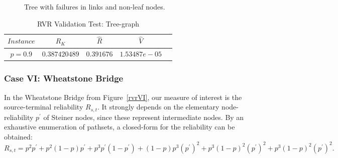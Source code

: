 \begin{figure}[H]
\begin{center}
\caption{Tree with failures in links and non-leaf nodes. \label{rvrV}}
\end{center}
\end{figure}

\begin{table}[H]
\caption{RVR Validation Test: Tree-graph} %
\centering  %
\begin{tabular}{|c|c|c|c|c|} %
\hline	$Instance$   &	$R_{K}$ & $\hat{R}$&  $\hat{V}$ \\
\hline	$p=0.9$	& $0.387420489$ &	$0.391676$ 	&	$1.53487e-05$	\\
\hline
\end{tabular}
\label{rvrTable5} %
\end{table}


\subsubsection*{Case VI: Wheatstone Bridge}
In the Wheatstone Bridge from Figure~\ref{rvrVI}, our measure of interest is the source-terminal reliability 
$R_{s,t}$. It strongly depends on the elementary node-reliability $p^{\prime}$ of Steiner nodes, since these 
represent intermediate nodes. By an exhaustive enumeration of pathsets, a closed-form for the reliability can be obtained:
\begin{equation*}
R_{s,t}= p^2p^{\prime} + p^2(1-p)p^{\prime} + p^3p^{\prime}(1-p^{\prime}) + (1-p)p^3(p^{\prime})^2 + 
p^3(1-p)^2(p^{\prime})^2+ p^3(1-p)^2(p^{\prime})^2.
\end{equation*}

